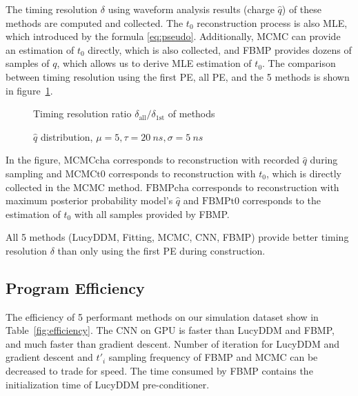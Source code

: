 The timing resolution $\delta$ using waveform analysis results (charge $\hat{q}$) of these methods are computed and collected. The $t_{0}$ reconstruction process is also MLE, which introduced by the formula \eqref{eq:pseudo}. Additionally, MCMC can provide an estimation of $t_{0}$ directly, which is also collected, and FBMP provides dozens of samples of $q$, which allows us to derive MLE estimation of $t_{0}$. The comparison between timing resolution using the first PE, all PE, and the 5 methods is shown in figure~\ref{fig:deltamethods}. 

\begin{figure}[H]
    \centering
    \resizebox{\textwidth}{!}{}
    \caption{\label{fig:deltamethods} Timing resolution ratio $\delta_{\mathrm{all}}/\delta_{\mathrm{1st}}$ of methods}
\end{figure}

\begin{figure}[H]
    \centering
    \resizebox{\textwidth}{!}{}
    \caption{\label{fig:recchargehist}  $\hat{q}$ distribution, $\mu=5, \tau=\SI{20}{ns}, \sigma=\SI{5}{ns}$}
\end{figure}

In the figure, $\mathrm{MCMCcha}$ corresponds to reconstruction with recorded $\hat{q}$ during sampling and $\mathrm{MCMCt0}$ corresponds to reconstruction with $t_{0}$, which is directly collected in the MCMC method. $\mathrm{FBMPcha}$ corresponds to reconstruction with maximum posterior probability model's $\hat{q}$ and $\mathrm{FBMPt0}$ corresponds to the estimation of $t_{0}$ with all samples provided by FBMP. 

All 5 methods (LucyDDM, Fitting, MCMC, CNN, FBMP) provide better timing resolution $\delta$ than only using the first PE during construction. 


\subsection{Program Efficiency}

The efficiency of 5 performant methods on our simulation dataset show in Table~\ref{fig:efficiency}. The CNN on GPU is faster than LucyDDM and FBMP, and much faster than gradient descent.  Number of iteration for LucyDDM and gradient descent and $t'_i$ sampling frequency of FBMP and MCMC can be decreased to trade for speed.  The time consumed by FBMP contains the initialization time of LucyDDM pre-conditioner.

